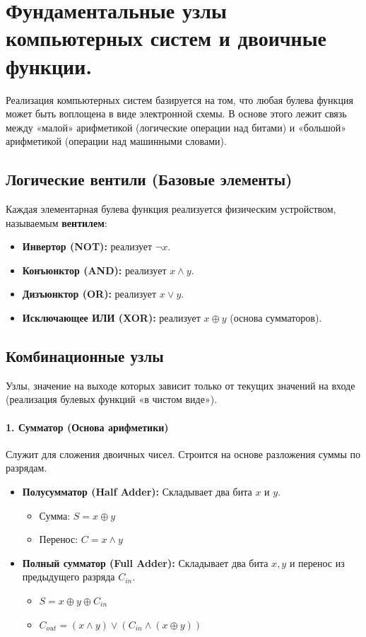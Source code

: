 \section{Фундаментальные узлы компьютерных систем и двоичные функции.}

Реализация компьютерных систем базируется на том, что любая булева функция может быть воплощена в виде электронной схемы. В основе этого лежит связь между «малой» арифметикой (логические операции над битами) и «большой» арифметикой (операции над машинными словами).

\subsection*{Логические вентили (Базовые элементы)}
Каждая элементарная булева функция реализуется физическим устройством, называемым \textbf{вентилем}:
\begin{itemize}
    \item \textbf{Инвертор (NOT):} реализует $\neg x$.
    \item \textbf{Конъюнктор (AND):} реализует $x \land y$.
    \item \textbf{Дизъюнктор (OR):} реализует $x \lor y$.
    \item \textbf{Исключающее ИЛИ (XOR):} реализует $x \oplus y$ (основа сумматоров).
\end{itemize}

\subsection*{Комбинационные узлы}
Узлы, значение на выходе которых зависит только от текущих значений на входе (реализация булевых функций «в чистом виде»).

\paragraph{1. Сумматор (Основа арифметики)}
Служит для сложения двоичных чисел. Строится на основе разложения суммы по разрядам.
\begin{itemize}
    \item \textbf{Полусумматор (Half Adder):} Складывает два бита $x$ и $y$.
    \begin{itemize}
        \item Сумма: $S = x \oplus y$
        \item Перенос: $C = x \land y$
    \end{itemize}
    \item \textbf{Полный сумматор (Full Adder):} Складывает два бита $x, y$ и перенос из предыдущего разряда $C_{in}$.
    \begin{itemize}
        \item $S = x \oplus y \oplus C_{in}$
        \item $C_{out} = (x \land y) \lor (C_{in} \land (x \oplus y))$
    \end{itemize}
\end{itemize}


